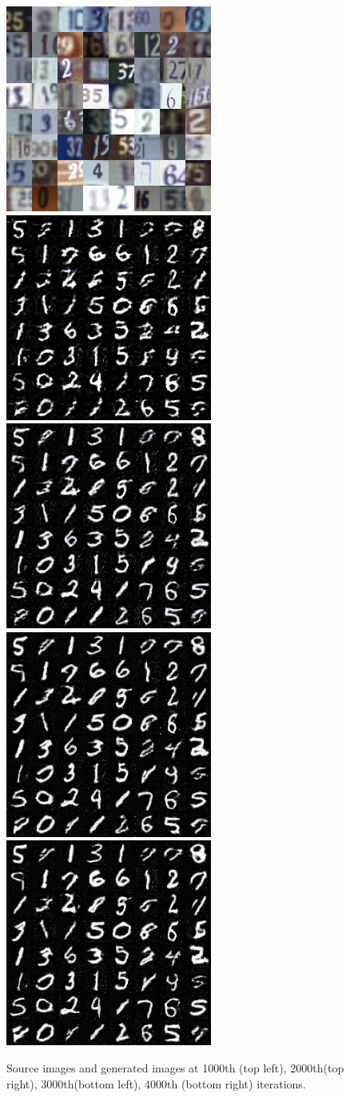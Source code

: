 \documentclass{article}
\begin{document}
\begin{figure}[H]
	\centering
	\includegraphics[width = 5 cm]{img/1000_0000_src.png}
	\\
	\includegraphics[width = 5 cm]{img/1000_0000_gen.png}
	\includegraphics[width = 5 cm]{img/2000_0000_gen.png}
	\includegraphics[width = 5 cm]{img/3000_0000_gen.png}
	\includegraphics[width = 5 cm]{img/4000_0000_gen.png}
	\caption{Source images and generated images at 1000th (top left), 2000th(top right), 3000th(bottom left), 4000th (bottom right) iterations.}
\end{figure}
\end{document}

